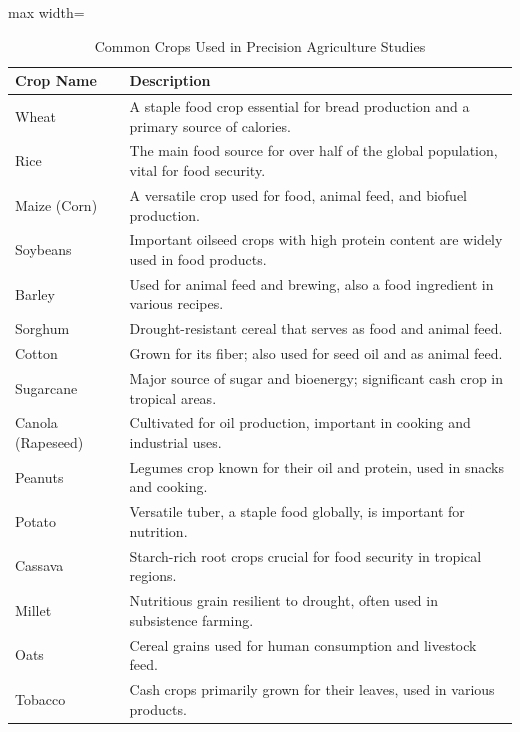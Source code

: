 \documentclass[conference]{IEEEtran}
\begin{document}
\begin{table}[t]
\centering
\caption{Common Crops Used in Precision Agriculture Studies}
\label{table:crops_summary}
\begin{adjustbox}{max width=\textwidth}
\begin{tabularx}{\textwidth}{|p{3cm}|X|}
\hline
\textbf{Crop Name} & \textbf{Description} \\
\hline
Wheat & A staple food crop essential for bread production and a primary source of calories. \\
\hline
Rice & The main food source for over half of the global population, vital for food security. \\
\hline
Maize (Corn) & A versatile crop used for food, animal feed, and biofuel production. \\
\hline
Soybeans & Important oilseed crops with high protein content are widely used in food products. \\
\hline
Barley & Used for animal feed and brewing, also a food ingredient in various recipes. \\
\hline
Sorghum & Drought-resistant cereal that serves as food and animal feed. \\
\hline
Cotton & Grown for its fiber; also used for seed oil and as animal feed. \\
\hline
Sugarcane & Major source of sugar and bioenergy; significant cash crop in tropical areas. \\
\hline
Canola (Rapeseed) & Cultivated for oil production, important in cooking and industrial uses. \\
\hline
Peanuts & Legumes crop known for their oil and protein, used in snacks and cooking. \\
\hline
Potato & Versatile tuber, a staple food globally, is important for nutrition. \\
\hline
Cassava & Starch-rich root crops crucial for food security in tropical regions. \\
\hline
Millet & Nutritious grain resilient to drought, often used in subsistence farming. \\
\hline
Oats & Cereal grains used for human consumption and livestock feed. \\
\hline
Tobacco & Cash crops primarily grown for their leaves, used in various products. \\
\hline
\end{tabularx}
\end{adjustbox}
\end{table}
\end{document}
